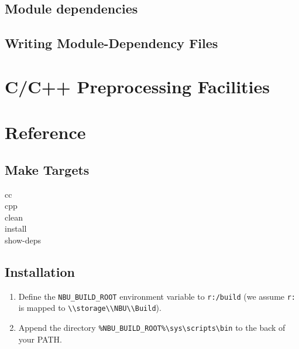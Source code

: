 \documentclass[a4paper]{article}
\begin{document}
\section{Module dependencies}

\section{Writing Module-Dependency Files}

\chapter{C/C++ Preprocessing Facilities}

\chapter{Reference}

\section{Make Targets}
\begin{description}
  \item[cc]
  \item[cpp]
  \item[clean]
  \item[install]
  \item[show-deps]
\end{description}

\section{Installation}

\begin{enumerate}
\item Define the \verb"NBU_BUILD_ROOT" environment variable to \verb"r:/build" (we assume \verb"r:" is mapped to \verb"\\storage\\NBU\\Build").
\item Append the directory \verb"%NBU_BUILD_ROOT%\sys\scripts\bin" to the back of your PATH.
\end{enumerate}
\end{document}
